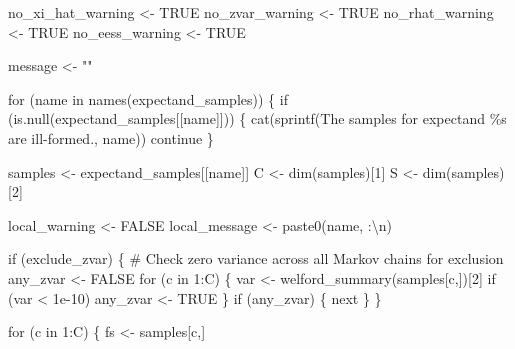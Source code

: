 \documentclass[
  letterpaper,
  DIV=11,
  numbers=noendperiod]{scrartcl}
\newenvironment{Shaded}{\begin{snugshade}}{\end{snugshade}}
\newcommand{\BuiltInTok}[1]{\textcolor[rgb]{0.00,0.23,0.31}{#1}}
\newcommand{\CharTok}[1]{\textcolor[rgb]{0.13,0.47,0.30}{#1}}
\newcommand{\CommentTok}[1]{\textcolor[rgb]{0.37,0.37,0.37}{#1}}
\newcommand{\ControlFlowTok}[1]{\textcolor[rgb]{0.00,0.23,0.31}{#1}}
\newcommand{\DecValTok}[1]{\textcolor[rgb]{0.68,0.00,0.00}{#1}}
\newcommand{\FloatTok}[1]{\textcolor[rgb]{0.68,0.00,0.00}{#1}}
\newcommand{\KeywordTok}[1]{\textcolor[rgb]{0.00,0.23,0.31}{#1}}
\newcommand{\NormalTok}[1]{\textcolor[rgb]{0.00,0.23,0.31}{#1}}
\newcommand{\OperatorTok}[1]{\textcolor[rgb]{0.37,0.37,0.37}{#1}}
\newcommand{\SpecialCharTok}[1]{\textcolor[rgb]{0.37,0.37,0.37}{#1}}
\newcommand{\StringTok}[1]{\textcolor[rgb]{0.13,0.47,0.30}{#1}}
\begin{document}
\begin{Shaded}
\begin{Highlighting}[]
\NormalTok{  no\_xi\_hat\_warning }\OperatorTok{\textless{}{-}}\NormalTok{ TRUE}
\NormalTok{  no\_zvar\_warning }\OperatorTok{\textless{}{-}}\NormalTok{ TRUE}
\NormalTok{  no\_rhat\_warning }\OperatorTok{\textless{}{-}}\NormalTok{ TRUE}
\NormalTok{  no\_eess\_warning }\OperatorTok{\textless{}{-}}\NormalTok{ TRUE}

\NormalTok{  message }\OperatorTok{\textless{}{-}} \StringTok{""}

  \ControlFlowTok{for}\NormalTok{ (name }\KeywordTok{in}\NormalTok{ names(expectand\_samples)) \{}
    \ControlFlowTok{if}\NormalTok{ (}\KeywordTok{is}\NormalTok{.null(expectand\_samples[[name]])) \{}
\NormalTok{      cat(sprintf(}\StringTok{\textquotesingle{}The samples for expectand \textasciigrave{}}\SpecialCharTok{\%s}\StringTok{\textasciigrave{} are ill{-}formed.\textquotesingle{}}\NormalTok{, name))}
      \ControlFlowTok{continue}
\NormalTok{    \}}
    
\NormalTok{    samples }\OperatorTok{\textless{}{-}}\NormalTok{ expectand\_samples[[name]]}
\NormalTok{    C }\OperatorTok{\textless{}{-}}\NormalTok{ dim(samples)[}\DecValTok{1}\NormalTok{]}
\NormalTok{    S }\OperatorTok{\textless{}{-}}\NormalTok{ dim(samples)[}\DecValTok{2}\NormalTok{]}
    
\NormalTok{    local\_warning }\OperatorTok{\textless{}{-}}\NormalTok{ FALSE}
\NormalTok{    local\_message }\OperatorTok{\textless{}{-}}\NormalTok{ paste0(name, }\StringTok{\textquotesingle{}:}\CharTok{\textbackslash{}n}\StringTok{\textquotesingle{}}\NormalTok{)}
  
    \ControlFlowTok{if}\NormalTok{ (exclude\_zvar) \{}
      \CommentTok{\# Check zero variance across all Markov chains for exclusion}
\NormalTok{      any\_zvar }\OperatorTok{\textless{}{-}}\NormalTok{ FALSE}
      \ControlFlowTok{for}\NormalTok{ (c }\KeywordTok{in} \DecValTok{1}\NormalTok{:C) \{}
\NormalTok{        var }\OperatorTok{\textless{}{-}}\NormalTok{ welford\_summary(samples[c,])[}\DecValTok{2}\NormalTok{]}
        \ControlFlowTok{if}\NormalTok{ (var }\OperatorTok{\textless{}} \FloatTok{1e{-}10}\NormalTok{)}
\NormalTok{          any\_zvar }\OperatorTok{\textless{}{-}}\NormalTok{ TRUE}
\NormalTok{      \}}
      \ControlFlowTok{if}\NormalTok{ (any\_zvar) \{}
        \BuiltInTok{next}
\NormalTok{      \}}
\NormalTok{    \}}
  
    \ControlFlowTok{for}\NormalTok{ (c }\KeywordTok{in} \DecValTok{1}\NormalTok{:C) \{}
\NormalTok{      fs }\OperatorTok{\textless{}{-}}\NormalTok{ samples[c,]}
      

\end{Highlighting}
\end{Shaded}
\end{document}
